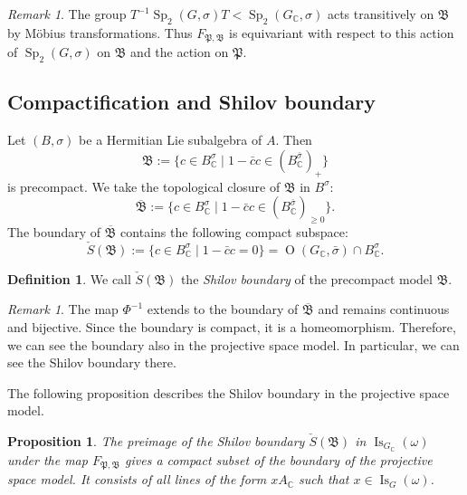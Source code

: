 \documentclass[a4paper,oneside,11pt]{amsart}
\DeclareMathOperator{\Sp}{Sp}
\DeclareMathOperator{\OO}{O}
\DeclareMathOperator{\Is}{Is}
\newcommand{\CC}{\mathbb C}
\theoremstyle{plain}
\newtheorem{prop}[teo]{Proposition}
\theoremstyle{definition}
\newtheorem{df}[teo]{Definition}
\theoremstyle{remark}
\newtheorem{rem}[teo]{Remark}
\newcommand{\defin}{\emph}
\begin{document}
\begin{rem}
The group $T^{-1}\Sp_2(G,\sigma)T<\Sp_2(G_\CC,\sigma)$ acts transitively on $\mathfrak B$ by M\"obius transformations. Thus $F_{\mathfrak P,\mathfrak B}$ is equivariant with respect to this action of $\Sp_2(G,\sigma)$ on $\mathfrak B$ and the action on $\mathfrak P$.
\end{rem}

\subsection{Compactification and Shilov boundary}\label{Shilov_R}

Let $(B,\sigma)$ be a Hermitian Lie subalgebra of $A$. Then
$$\mathfrak B:=\{c\in B^\sigma_\CC\mid 1-\bar cc\in (B^{\bar\sigma}_\CC)_+\}$$
is precompact. We take the topological closure of $\mathfrak B$ in  $B^\sigma$:
$$\overline{\mathfrak B}:=\{c\in B^\sigma_\CC\mid 1-\bar cc\in (B^{\bar\sigma}_\CC)_{\geq 0}\}.$$
The boundary of $\overline{\mathfrak B}$ contains the following compact subspace:
$$\check{S}(\mathfrak B):=\{c\in B^\sigma_\CC\mid 1-\bar cc=0\}=\OO(G_\CC,\bar\sigma)\cap B^\sigma_\CC.$$

\begin{df}
We call $\check{S}(\mathfrak B)$ the \defin{Shilov boundary} of the precompact model $\mathfrak B$.
\end{df}


\begin{rem}
The map $\Phi^{-1}$ extends to the boundary of $\overline{\mathfrak B}$ and remains continuous and bijective. Since the boundary is compact, it is a homeomorphism. Therefore, we can see the boundary also in the projective space model. In particular, we can see the Shilov boundary there.
\end{rem}

The following proposition describes the Shilov boundary in the projective space model.

\begin{prop}
The preimage of the Shilov boundary $\check{S}(\mathfrak B)$ in $\Is_{G_\CC}(\omega)$ under the map $F_{\mathfrak P,\mathfrak B}$ gives a compact subset of the boundary of the projective space model. It consists of all lines of the form $xA_\CC$ such that $x\in\Is_G(\omega)$.
\end{prop}
\end{document}
